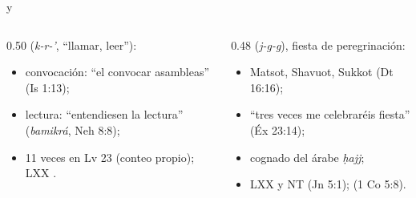 \begin{frame}{ y }
\begin{columns}[t,onlytextwidth]
\begin{column}{0.50\textwidth}\small
{} (\emph{k-r-'}, ``llamar, leer''):
\begin{itemize}\scriptsize
\item convocación: ``el convocar asambleas'' (Is 1:13);
\item lectura: ``entendiesen la lectura'' (\emph{bamikrá}, Neh 8:8);
\item 11 veces en Lv 23 (conteo propio); LXX .
\end{itemize}
\end{column}
\begin{column}{0.48\textwidth}\small
{} (\emph{j-g-g}), fiesta de peregrinación:
\begin{itemize}\scriptsize
\item Matsot, Shavuot, Sukkot (Dt 16:16);
\item ``tres veces me celebraréis fiesta'' (Éx 23:14);
\item cognado del árabe \emph{ḥajj};
\item LXX y NT  (Jn 5:1);  (1 Co 5:8).
\end{itemize}
\end{column}
\end{columns}
\end{frame}


